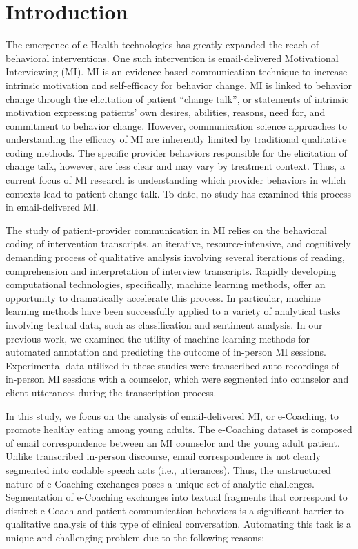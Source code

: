 \documentclass{amia}
\begin{document}
\section*{Introduction}
The emergence of e-Health technologies has greatly expanded the reach of behavioral interventions. One such intervention is email-delivered Motivational Interviewing (MI). MI is an evidence-based communication technique to increase intrinsic motivation and self-efficacy for behavior change\cite{miller2012motivational,miller2009toward}. MI is linked to behavior change through the elicitation of patient ``change talk'', or statements of intrinsic motivation expressing patients’ own desires, abilities, reasons, need for, and commitment to behavior change\cite{apodaca2009mechanisms}. However, communication science approaches to understanding the efficacy of MI are inherently limited by traditional qualitative coding methods. The specific provider behaviors responsible for the elicitation of change talk, however, are less clear and may vary by treatment context. Thus, a current focus of MI research is understanding which provider behaviors in which contexts lead to patient change talk. To date, no study has examined this process in email-delivered MI.

The study of patient-provider communication in MI relies on the behavioral coding of intervention transcripts, an iterative, resource-intensive, and cognitively demanding process of qualitative analysis involving several iterations of reading, comprehension and interpretation of interview transcripts. Rapidly developing computational technologies, specifically, machine learning methods, offer an opportunity to dramatically accelerate this process. In particular, machine learning methods have been successfully applied to a variety of analytical tasks involving textual data, such as classification\cite{nigam2000text} and sentiment analysis.\cite{wang2012baselines} In our previous work, we examined the utility of machine learning methods for automated annotation \cite{hasan2016study,kotov2015interpretable} and predicting the outcome \cite{hasan2018predicting} of in-person MI sessions. Experimental data utilized in these studies were transcribed auto recordings of in-person MI sessions with a counselor, which were segmented into counselor and client utterances during the transcription process. 

In this study, we focus on the analysis of email-delivered MI, or e-Coaching, to promote healthy eating among young adults. The e-Coaching dataset is composed of email correspondence between an MI counselor and the young adult patient. Unlike transcribed in-person discourse, email correspondence is not clearly segmented into codable speech acts (i.e., utterances). Thus, the unstructured nature of e-Coaching exchanges poses a unique set of analytic challenges. Segmentation of e-Coaching exchanges into textual fragments that correspond to distinct e-Coach and patient communication behaviors is a significant barrier to qualitative analysis of this type of clinical conversation. Automating this task is a unique and challenging problem due to the following reasons:
\end{document}
